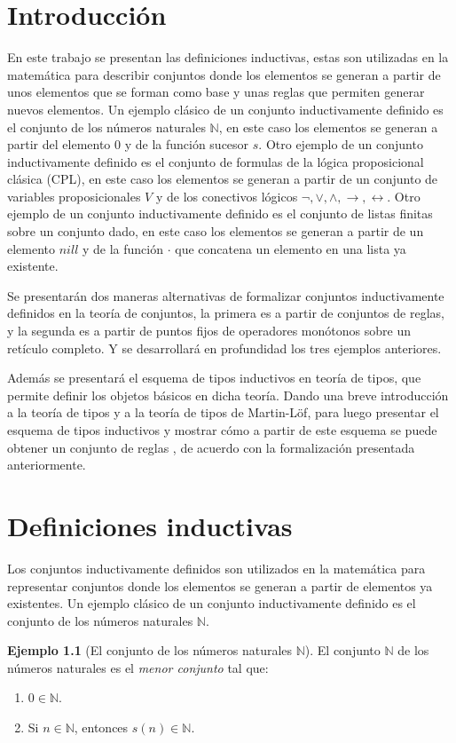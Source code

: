 \documentclass[11pt,oneside]{report}
\theoremstyle{plain}
\theoremstyle{definition}
\newtheorem{ejemplo}{Ejemplo}[chapter]
\newcommand{\N}{\mathbb{N}}
\begin{document}
\newpage
\null
\thispagestyle{empty}
\newpage
\tableofcontents
\chapter*{Introducción}
En este trabajo se presentan las definiciones inductivas, estas son utilizadas en la matemática para describir conjuntos donde los elementos se generan a partir de unos elementos que se forman como base y unas reglas que permiten generar nuevos elementos. Un ejemplo clásico de un conjunto inductivamente definido es el conjunto de los números naturales $\N$, en este caso los elementos se generan a partir del elemento $0$ y de la función sucesor $s$. Otro ejemplo de un conjunto inductivamente definido es el conjunto de formulas de la lógica proposicional clásica (CPL), en este caso los elementos se generan a partir de un conjunto de variables proposicionales $V$ y de los conectivos lógicos $\neg, \lor, \land, \rightarrow, \leftrightarrow$. Otro ejemplo de un conjunto inductivamente definido es el conjunto de listas finitas sobre un conjunto dado, en este caso los elementos se generan a partir de un elemento $nill$ y de la función $\cdot$ que concatena un elemento en una lista ya existente.

Se presentarán dos maneras alternativas de formalizar conjuntos inductivamente definidos en la teoría de conjuntos, la primera es a partir de conjuntos de reglas, y la segunda es a partir de puntos fijos de operadores monótonos sobre un retículo completo. Y se desarrollará en profundidad los tres ejemplos anteriores.

Además se presentará el esquema de tipos inductivos en teoría de tipos, que permite definir los objetos básicos en dicha teoría. Dando una breve introducción a la teoría de tipos y a la teoría de tipos de Martin-Löf, para luego presentar el esquema de tipos inductivos y mostrar cómo a partir de este esquema se puede obtener un conjunto de reglas , de acuerdo con la formalización presentada anteriormente.

\chapter{Definiciones inductivas}
Los conjuntos inductivamente definidos son utilizados en la matemática para representar conjuntos donde los elementos se generan a partir de elementos ya existentes. Un ejemplo clásico de un conjunto inductivamente definido es el conjunto de los números naturales $\N$.
\begin{ejemplo} [El conjunto de los números naturales $\N$]
    El conjunto $\N$ de los números naturales es el \emph{menor conjunto} tal que:
    \begin{enumerate}
        \item $0 \in \N$.
        \item Si $n \in \N$, entonces $s(n )\in \N$.
    \end{enumerate}
\end{ejemplo}
\end{document}
